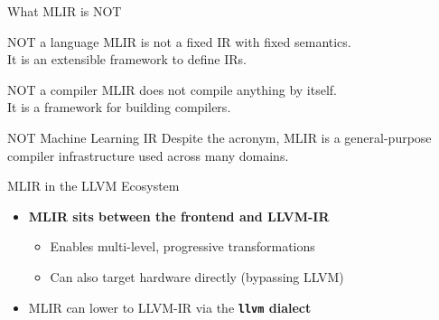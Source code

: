 \begin{frame}{What MLIR is NOT}
  \begin{block}{NOT a language}
    MLIR is not a fixed IR with fixed semantics.\\
    It is an extensible framework to define IRs.
  \end{block}
  \medskip
  \begin{exampleblock}{NOT a compiler}
    MLIR does not compile anything by itself.\\
    It is a framework for building compilers.
  \end{exampleblock}
  \medskip
  \begin{block}{NOT Machine Learning IR}
    Despite the acronym, MLIR is a general-purpose\\
    compiler infrastructure used across many domains.
  \end{block}
\end{frame}


\begin{frame}{MLIR in the LLVM Ecosystem}
  \begin{center}
  \end{center}
  \bigskip
  \begin{itemize}
    \item \textbf{MLIR sits between the frontend and LLVM-IR}
      \begin{itemize}
        \item Enables multi-level, progressive transformations
        \item Can also target hardware directly (bypassing LLVM)
      \end{itemize}
    \item MLIR can lower to LLVM-IR via the
          \textbf{\textcolor{mainAccent}{\texttt{llvm} dialect}}
  \end{itemize}
\end{frame}


